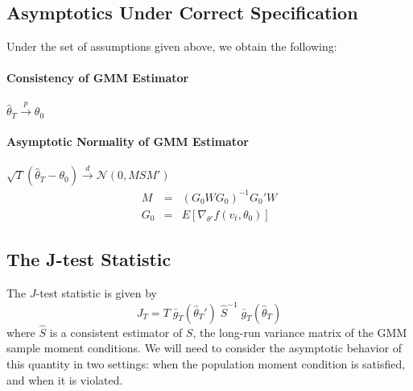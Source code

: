 \documentclass[12pt]{article}
\theoremstyle{definition}
\begin{document}
\subsection{Asymptotics Under Correct Specification}
Under the set of assumptions given above, we obtain the following:

\paragraph{Consistency of GMM Estimator} $\widehat{\theta}_T \overset{p}{\rightarrow} \theta_0$

\paragraph{Asymptotic Normality of GMM Estimator}
$\sqrt{T} (\widehat{\theta}_T - \theta_0)\overset{d}{\rightarrow} \mathcal{N}(0,MSM')$
	\begin{eqnarray*}
		M &=& (G_0 W G_0)^{-1} G_0'W\\
		G_0 &=& E[\nabla_{\theta'} f(v_t, \theta_0)]
	\end{eqnarray*}


\subsection{The J-test Statistic}
The $J$-test statistic is given by
	$$J_T = T\; \bar{g}_T(\widehat{\theta}_T')\; \widehat{S}^{-1} \;\bar{g}_T(\widehat{\theta}_T)$$
where $\widehat{S}$ is a consistent estimator of $S$, the long-run variance matrix of the GMM sample moment conditions. We will need to consider the asymptotic behavior of this quantity in two settings: when the population moment condition is satisfied, and when it is violated.
\end{document}
